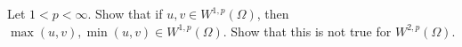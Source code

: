 Let $1 < p < \infty$. Show that if $u, v \in W^{1, p}(\Omega)$, then $\max(u, v), \min(u, v) \in W^{1, p}(\Omega)$.
Show that this is not true for $W^{2, p}(\Omega)$.
